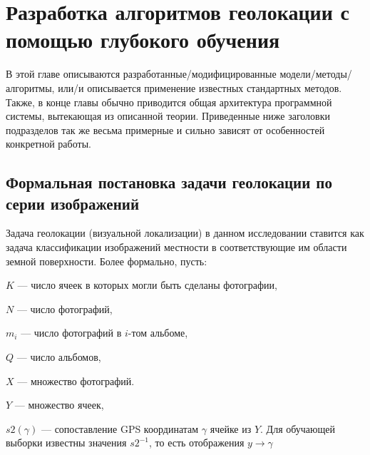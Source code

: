  \chapter{Разработка алгоритмов геолокации с помощью глубокого обучения}

В этой главе описываются разработанные/модифицированные модели/методы/
алгоритмы, или/и описывается применение известных стандартных методов. Также, 
в конце главы обычно приводится общая архитектура программной системы, 
вытекающая из описанной теории. Приведенные ниже заголовки подразделов так же 
весьма примерные и сильно зависят от особенностей конкретной работы.
\section{Формальная постановка задачи геолокации по серии изображений}

Задача геолокации (визуальной локализации) в данном исследовании ставится как задача классификации изображений местности в соответствующие им области земной поверхности. Более формально, пусть:

\begin{compactitem}
	\item $K$ --- число ячеек в которых могли быть сделаны фотографии,
	\item $N$ --- число фотографий,
	\item $m_i$ --- число фотографий в $i$-том альбоме,
	\item $ Q $ --- число альбомов,
	\item $X$ --- множество фотографий. 
	\item $ Y $ --- множество ячеек, 
	\item $ s2(\gamma) $ --- сопоставление GPS координатам $ \gamma $ ячейке из $ Y $. Для обучающей выборки известны значения $ s2^{-1} $, то есть отображения $ y \to \gamma $
\end{compactitem}

